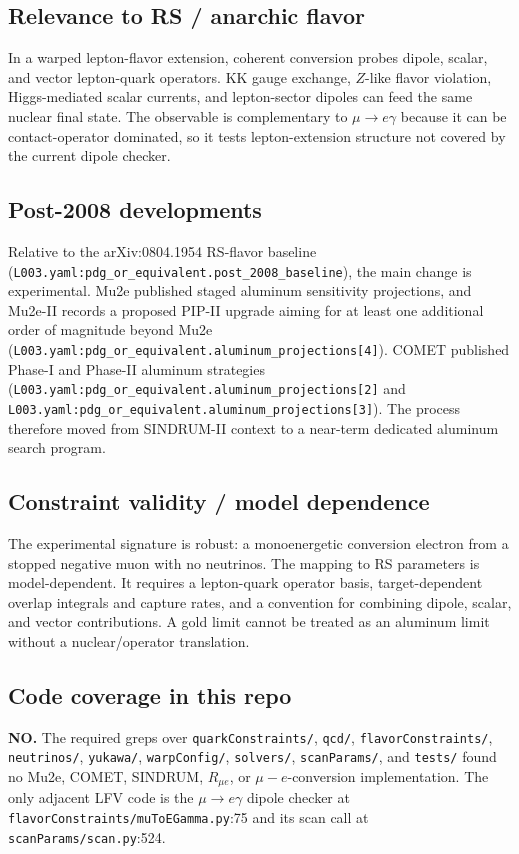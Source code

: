 \subsection*{Relevance to RS / anarchic flavor}
In a warped lepton-flavor extension, coherent conversion probes dipole,
scalar, and vector lepton-quark operators.  KK gauge exchange, \(Z\)-like
flavor violation, Higgs-mediated scalar currents, and lepton-sector dipoles can
feed the same nuclear final state.  The observable is complementary to
\(\mu\to e\gamma\) because it can be contact-operator dominated, so it tests
lepton-extension structure not covered by the current dipole checker.

\subsection*{Post-2008 developments}
Relative to the arXiv:0804.1954 RS-flavor baseline
(\texttt{L003.yaml:pdg\_or\_equivalent.post\_2008\_baseline}), the main change
is experimental.  Mu2e published staged aluminum sensitivity projections, and
Mu2e-II records a proposed PIP-II upgrade aiming for at least one additional
order of magnitude beyond Mu2e
(\texttt{L003.yaml:pdg\_or\_equivalent.aluminum\_projections[4]}).  COMET
published Phase-I and Phase-II aluminum strategies
(\texttt{L003.yaml:pdg\_or\_equivalent.aluminum\_projections[2]} and
\texttt{L003.yaml:pdg\_or\_equivalent.aluminum\_projections[3]}).  The process
therefore moved from SINDRUM-II context to a near-term dedicated aluminum
search program.

\subsection*{Constraint validity / model dependence}
The experimental signature is robust: a monoenergetic conversion electron from
a stopped negative muon with no neutrinos.  The mapping to RS parameters is
model-dependent.  It requires a lepton-quark operator basis, target-dependent
overlap integrals and capture rates, and a convention for combining dipole,
scalar, and vector contributions.  A gold limit cannot be treated as an
aluminum limit without a nuclear/operator translation.

\subsection*{Code coverage in this repo}
\textbf{NO.}  The required greps over \texttt{quarkConstraints/}, \texttt{qcd/},
\texttt{flavorConstraints/}, \texttt{neutrinos/}, \texttt{yukawa/},
\texttt{warpConfig/}, \texttt{solvers/}, \texttt{scanParams/}, and
\texttt{tests/} found no Mu2e, COMET, SINDRUM, \(R_{\mu e}\), or
\(\mu-e\)-conversion implementation.  The only adjacent LFV code is the
\(\mu\to e\gamma\) dipole checker at \texttt{flavorConstraints/muToEGamma.py}:75
and its scan call at \texttt{scanParams/scan.py}:524.

